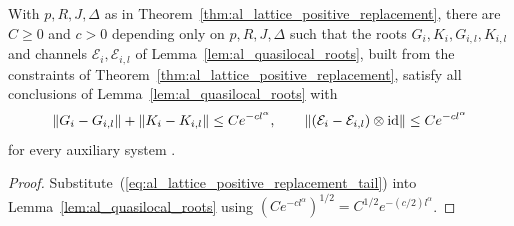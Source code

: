 \begin{lemma}
    \label{thm:al_lattice_quasilocal_roots}
    \leanok
    With $p,R,J,\Delta$ as in Theorem~\ref{thm:al_lattice_positive_replacement},
    there are $C\ge0$ and $c>0$ depending only on $p,R,J,\Delta$ such that the
    roots $G_i,K_i,G_{i,l},K_{i,l}$ and channels $\mathcal E_i,\mathcal E_{i,l}$
    of Lemma~\ref{lem:al_quasilocal_roots}, built from the constraints of
    Theorem~\ref{thm:al_lattice_positive_replacement}, satisfy all conclusions
    of Lemma~\ref{lem:al_quasilocal_roots} with
    \begin{align}
        \|G_i-G_{i,l}\|+\|K_i-K_{i,l}\|\le Ce^{-cl^\alpha},\qquad
        \|(\mathcal E_i-\mathcal E_{i,l})\otimes\mathrm{id}\|\le Ce^{-cl^\alpha}
        \notag
    \end{align}
    for every auxiliary system \cite[Lemma~4.4]{OpenAI2026AreaLaw}.
\end{lemma}
\begin{proof}\leanok
    Substitute~(\ref{eq:al_lattice_positive_replacement_tail}) into
    Lemma~\ref{lem:al_quasilocal_roots} using
    $(Ce^{-cl^\alpha})^{1/2}=C^{1/2}e^{-(c/2)l^\alpha}$.
\end{proof}

